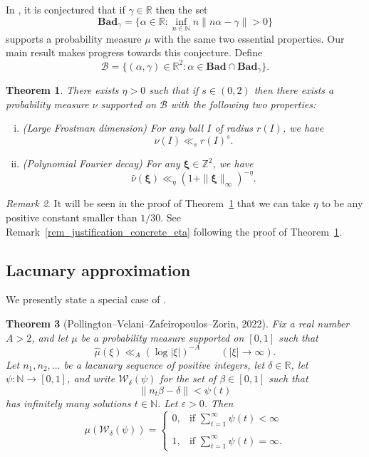 \documentclass[12pt, reqno]{amsart}
\newtheorem{thm}{Theorem}[section]
\theoremstyle{definition}
\theoremstyle{remark}
\newtheorem{remark}[thm]{Remark}
\numberwithin{equation}{section}
\def\alp{{\alpha}} \def\bfalp{{\boldsymbol \alpha}}
\def\bet{{\beta}}  \def\bfbet{{\boldsymbol \beta}}
\def\gam{{\gamma}} \def\Gam{{\Gamma}}
\def\del{{\delta}} \def\Del{{\Delta}}
\def\eps{\varepsilon}
\def \bN {\mathbb N}
\def \bR {\mathbb R}
\def \bZ {\mathbb Z}
\def \bxi {{\boldsymbol{\xi}}}
\def \cB {\mathcal B}
\def \cW {\mathcal W}
\def \Bad {{\mathrm{\mathbf{Bad}}}}
\begin{document}
	In \cite{PVZZ2022}, it is conjectured that if $\gam \in \bR$ then the set
	\[
	\Bad_\gam = \{ \alp \in \bR:
	\inf_{n \in \bN} n
	\| n \alp - \gam \| > 0 \}
	\]
	supports a probability measure $\mu$ with the same two essential properties. Our main result makes progress towards this conjecture. Define
	\[
	\cB = \{ (\alp,\gam) \in \bR^2:
	\alp \in \Bad \cap \Bad_\gam \}.
	\]
	
	\begin{thm} \label{MainThm}
		There exists $\eta > 0$ such that if
		$s \in (0,2)$ then there exists a probability measure $\nu$ supported on $\cB$ with the following two properties:
		\begin{enumerate}[(i)]
			\item \label{MainThm_point_Frostman_dimension} (Large Frostman dimension) 
			For any ball $I$ of radius 
			$r(I)$, we have
			\begin{equation}
				\label{Frostman}
				\nu(I) \ll_s r(I)^s.
			\end{equation}
			\item \label{MainThm_point_decay} (Polynomial Fourier decay)
			For any $\bxi \in \bZ^2$, 
			we have
			\[
			\widehat \nu(\bxi) \ll_\eta
			(1 + \| \bxi \|_\infty)^{-\eta}.
			\]
		\end{enumerate}
	\end{thm}
	\begin{remark} \label{rem_concrete_eta}
		It will be seen in the proof of Theorem~\ref{MainThm} that we can take $\eta$ to be any positive constant smaller than $1/30$. See Remark~\ref{rem_justification_concrete_eta} following the proof of Theorem~\ref{MainThm}.
	\end{remark}
	
	\subsection{Lacunary approximation}
	
	We presently state a special case of
	\cite[Corollary 1]{PVZZ2022}.
	
	\begin{thm} [Pollington--Velani--Zafeiropoulos--Zorin, 2022]
		Fix a real number $A > 2$, and let $\mu$ be a probability measure supported on $[0,1]$ such that
		\[
		\widehat \mu(\xi) \ll_A 
		(\log |\xi|)^{-A}
		\qquad (|\xi| \to \infty).
		\]
		Let $n_1, n_2, \ldots$ be a lacunary sequence of positive integers, let $\del \in \bR$, let 
		$\psi: \bN \to [0,1]$, and write
		$\cW_\del(\psi)$ for the set of 
		$\bet \in [0,1]$ such that
		\[
		\| n_t \bet - \del \| < \psi(t)
		\]
		has infinitely many solutions $t \in \bN$. Let $\eps > 0$. Then
		\[
		\mu(\cW_\del(\psi)) =
		\begin{cases}
			0, &\text{if } \displaystyle
			\sum_{t=1}^\infty
			\psi(t) < \infty \\ \\
			1, &\text{if } \displaystyle
			\sum_{t=1}^\infty
			\psi(t) = \infty.
		\end{cases}
		\]
	\end{thm}
	
\end{document}
